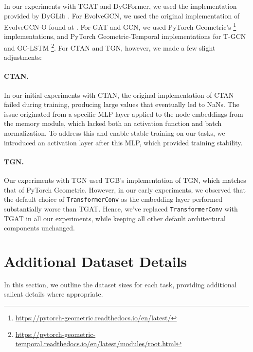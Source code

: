 In our experiments with TGAT and DyGFormer, we used the implementation provided by DyGLib \cite{dygformer}. For EvolveGCN, we used the original implementation of EvolveGCN-O found at \cite{evolvegcn}. For GAT and GCN, we used PyTorch Geometric's \footnote[2]{\url{https://pytorch-geometric.readthedocs.io/en/latest/}} implementations, and PyTorch Geometric-Temporal implementations for T-GCN and GC-LSTM \footnote[3]{\url{https://pytorch-geometric-temporal.readthedocs.io/en/latest/modules/root.html}}. For CTAN and TGN, however, we made a few slight adjustments:

\paragraph{CTAN.} In our initial experiments with CTAN, the original implementation of CTAN \cite{ctan} failed during training, producing large values that eventually led to NaNs. The issue originated from a specific MLP layer applied to the node embeddings from the memory module, which lacked both an activation function and batch normalization. To address this and enable stable training on our tasks, we introduced an activation layer after this MLP, which provided training stability.
\paragraph{TGN.}
Our experiments with TGN used TGB's \cite{tgb} implementation of TGN, which matches that of PyTorch Geometric. However, in our early experiments, we observed that the default choice of \texttt{TransformerConv} as the embedding layer performed substantially worse than TGAT. Hence, we've replaced \texttt{TransformerConv} with TGAT in all our experiments, while keeping all other default architectural components unchanged.

\section{Additional Dataset Details}
In this section, we outline the dataset sizes for each task, providing additional salient details where appropriate. 

